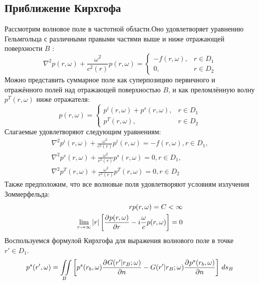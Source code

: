\documentclass[a4paper, fontsize=14pt]{article}
\begin{document}
	\subsection{Приближение Кирхгофа}
	Рассмотрим волновое поле в частотной области.Оно удовлетворяет уравнению Гельмгольца с различными правыми частями выше и ниже отражающей поверхности $B$ \cite{zhdanov2007}:
	\begin{equation}
		\nabla^2 p(r,\omega) + \frac{\omega^2}{c^2(r)}p(r,\omega) = \begin{cases}
			-f(r,\omega), & r \in D_1 \\
			0,            & r \in D_2
		\end{cases}
		\label{eq:helmp}
	\end{equation} 
	Можно представить суммарное поле как суперпозицию первичного и отражённого полей над отражающей поверхностью $B$, и как преломлённую волну $p^T(r,\omega)$ ниже отражателя:
	\begin{equation}
		p(r,\omega) = \begin{cases}
			p^i(r,\omega)+p^s(r,\omega),& r \in D_1 \\
			p^T(r,\omega), & r \in D_2
		\end{cases}
	\end{equation}
	Слагаемые удовлетворяют следующим уравнениям:
	\begin{eqnarray}
		\nabla^2 p^i(r,\omega) + \frac{\omega^2}{c^2(r)}p^i(r,\omega) =-f(r,\omega), r \in D_1,\\
		\nabla^2 p^s(r,\omega) + \frac{\omega^2}{c^2(r)}p^s(r,\omega) = 0, r \in D_1,\\
		\nabla^2 p^T(r,\omega) + \frac{\omega^2}{c^2(r)}p^T(r,\omega) =0, r \in D_2
	\end{eqnarray}
	Также предположим, что все волновые поля удовлетворяют условиям излучения Зоммерфельда:
	\begin{eqnarray}
		rp(r,\omega) = C < \infty\\
		\lim\limits_{r\to\infty} |r|\left[\frac{\partial ^ {  } p(r,\omega)}{\partial r ^ {  } } - i\frac{\omega}{c}p(r,\omega)\right] =0
	\end{eqnarray}
	Воспользуемся формулой Кирхгофа для выражения волнового поле в точке $r'\in D_1$.
	\begin{equation}
		p^s(r',\omega)= \iint\limits_B \left[ p^s(r_b,\omega)\frac{\partial ^ {  }  G(r'|r_B;\omega)}{\partial n ^ {  } }- G(r'|r_B;\omega)\frac{\partial ^ {  } p^s(r_b,\omega)}{\partial n ^ {  } }\right] \,ds_B
	\end{equation}
\end{document}
